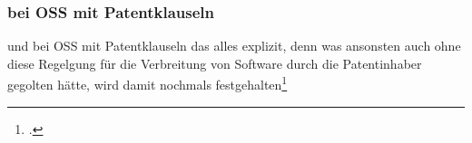 \documentclass[DIV=calc,BCOR=5mm,11pt,headings=small,oneside,abstract=true, toc=bib]{scrartcl}
\begin{document}
\subsubsection{bei OSS mit Patentklauseln}
und bei OSS mit Patentklauseln das alles explizit, denn \glqq{}was
ansonsten auch ohne diese Regelgung für die Verbreitung von Software
durch die Patentinhaber gegolten hätte, wird damit nochmals
festgehalten\grqq{}\footcite[vgl.][128]{Suchomski2011a}

\small

\end{document}
